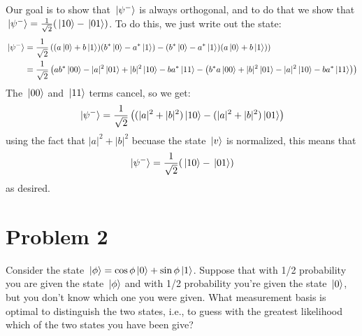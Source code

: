 \documentclass[10pt]{article}
\begin{document}
\begin{enumerate}[label=\alph*)]
			\begin{solution}
				Our goal is to show that \( \ket*{\psi^{-}} \) is always orthogonal, and to do that we show that 
				\( \ket*{\psi^{-}} = \frac{1}{\sqrt{2} }(\ket*{10} - \ket*{01}) \). To do this, we just write out 
				the state:
				\begin{align*}
					\ket*{\psi^{-}} &= \frac{1}{\sqrt{2} }\left( (a \ket*{0} + b\ket*{1})
					(b^{*}\ket*{0} - a^{*}\ket*{1}) - 
				(b^{*}\ket*{0} - a^{*}\ket*{1})(a\ket*{0} + b\ket*{1})\right)  \\
				&= \frac{1}{\sqrt{2} }\left( ab^{*}\ket*{00} - |a|^2 \ket*{01} + 
				|b|^2\ket*{10} - ba^{*}\ket*{11} - \left( b^{*}a\ket*{00} + |b|^2\ket*{01} - |a|^2 \ket*{10}
			- ba^{*}\ket*{11}\right) \right)  
				\end{align*}
				The \( \ket*{00} \) and \( \ket*{11} \) terms cancel, so we get: 
				\[
				\ket*{\psi^{-}} = \frac{1}{\sqrt{2} }\left( (|a|^2 + |b|^2) \ket*{10} - 
				(|a|^2 + |b|^2) \ket*{01}\right) 
				\] 
				using the fact that \( |a|^2 + |b|^2 \) becuase the state \( \ket*{v} \) is normalized, 
				this means that
				\[
					\ket*{\psi^{-}} = \frac{1}{\sqrt{2} }(\ket*{10} - \ket*{01})
				\] 
				 as desired. 
			\end{solution}
	\end{enumerate}
	\pagebreak
	\section*{Problem 2}
	Consider the state \( \ket*{\phi} = \cos \phi \ket*{0} + \sin \phi \ket*{1} \). Suppose that with 1/2 probability 
	you are given the state \( \ket*{\phi} \) and with 1/2 probability you're given the state \( \ket*{0} \), but 
	you don't know which one you were given. What measurement basis is optimal to distinguish the two states, i.e., 
	to guess with the greatest likelihood which of the two states you have been give? 
\end{document}
